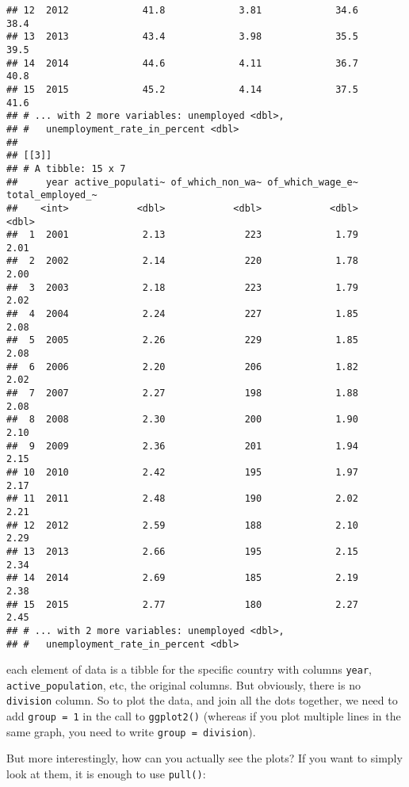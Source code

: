 \documentclass[
]{article}
\begin{document}
\begin{verbatim}
## 12  2012             41.8             3.81             34.6             38.4
## 13  2013             43.4             3.98             35.5             39.5
## 14  2014             44.6             4.11             36.7             40.8
## 15  2015             45.2             4.14             37.5             41.6
## # ... with 2 more variables: unemployed <dbl>,
## #   unemployment_rate_in_percent <dbl>
## 
## [[3]]
## # A tibble: 15 x 7
##     year active_populati~ of_which_non_wa~ of_which_wage_e~ total_employed_~
##    <int>            <dbl>            <dbl>            <dbl>            <dbl>
##  1  2001             2.13              223             1.79             2.01
##  2  2002             2.14              220             1.78             2.00
##  3  2003             2.18              223             1.79             2.02
##  4  2004             2.24              227             1.85             2.08
##  5  2005             2.26              229             1.85             2.08
##  6  2006             2.20              206             1.82             2.02
##  7  2007             2.27              198             1.88             2.08
##  8  2008             2.30              200             1.90             2.10
##  9  2009             2.36              201             1.94             2.15
## 10  2010             2.42              195             1.97             2.17
## 11  2011             2.48              190             2.02             2.21
## 12  2012             2.59              188             2.10             2.29
## 13  2013             2.66              195             2.15             2.34
## 14  2014             2.69              185             2.19             2.38
## 15  2015             2.77              180             2.27             2.45
## # ... with 2 more variables: unemployed <dbl>,
## #   unemployment_rate_in_percent <dbl>
\end{verbatim}

each element of data is a tibble for the specific country with columns \texttt{year}, \texttt{active\_population},
etc, the original columns. But obviously, there is no \texttt{division} column. So to plot the data, and
join all the dots together, we need to add \texttt{group\ =\ 1} in the call to \texttt{ggplot2()} (whereas if you
plot multiple lines in the same graph, you need to write \texttt{group\ =\ division}).

But more interestingly, how can you actually see the plots? If you want to simply look at them, it
is enough to use \texttt{pull()}:
\end{document}
